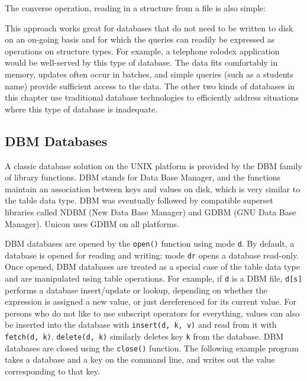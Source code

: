 \noindent
The converse operation, reading in a structure from a file is also
simple:


This approach works great for databases that do not need to be written
to disk on an on-going basis and for which the queries can readily be
expressed as operations on structure types. For example, a telephone
rolodex application would be well-served by this type of database. The
data fits comfortably in memory, updates often occur in batches, and
simple queries (such as a student{\textquotesingle}s name) provide
sufficient access to the data. The other two kinds of databases in this
chapter use traditional database technologies to efficiently address
situations where this type of database is inadequate.

\subsection{DBM Databases}

A classic database solution on the UNIX platform is provided by the DBM
family of library functions. DBM stands for Data Base
Manager, and the functions maintain an association between keys and
values on disk, which is very similar to the table data type. DBM was
eventually followed by compatible superset libraries called NDBM (New
Data Base Manager) and GDBM (GNU Data Base Manager). Unicon uses GDBM
on all platforms.

DBM databases are opened by the \texttt{open()} function using mode
\texttt{{\textquotedbl}d{\textquotedbl}}. By default, a database is
opened for reading and writing; mode
\texttt{{\textquotedbl}dr{\textquotedbl}} opens a database read-only.
Once opened, DBM databases are treated as a special case of the table
data type and are manipulated using table operations. For example, if
\texttt{d} is a DBM file, \texttt{d[s]} performs a database
insert/update or lookup, depending on whether the expression is
assigned a new value, or just dereferenced for its
current value. For persons who do not like to use subscript operators for everything, values can also be
inserted into the database with \texttt{insert(d, k, v)} and read from it with
\texttt{fetch(d, k)}. \texttt{delete(d, k)} similarly deletes key \texttt{k} from
the database. DBM databases are closed using the \texttt{close()}
function. The following example program takes a database and a key on
the command line, and writes out the value corresponding to that key.

